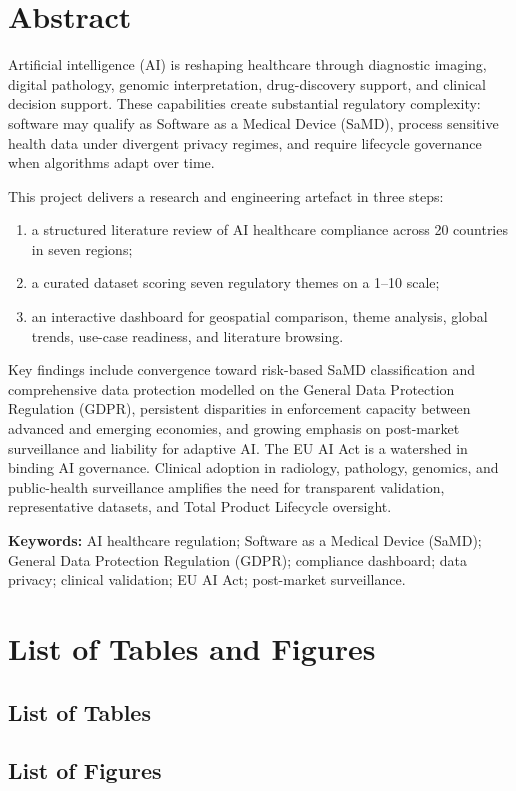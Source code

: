\documentclass[12pt,a4paper]{report}
\begin{document}
\chapter*{Abstract}

Artificial intelligence (AI) is reshaping healthcare through diagnostic imaging, digital pathology, genomic interpretation, drug-discovery support, and clinical decision support. These capabilities create substantial regulatory complexity: software may qualify as Software as a Medical Device (SaMD), process sensitive health data under divergent privacy regimes, and require lifecycle governance when algorithms adapt over time.

This project delivers a research and engineering artefact in three steps:
\begin{enumerate}[label=(\roman*), leftmargin=*, itemsep=2pt, topsep=4pt]
  \item a structured literature review of AI healthcare compliance across 20 countries in seven regions;
  \item a curated dataset scoring seven regulatory themes on a 1--10 scale;
  \item an interactive dashboard for geospatial comparison, theme analysis, global trends, use-case readiness, and literature browsing.
\end{enumerate}

Key findings include convergence toward risk-based SaMD classification and comprehensive data protection modelled on the General Data Protection Regulation (GDPR), persistent disparities in enforcement capacity between advanced and emerging economies, and growing emphasis on post-market surveillance and liability for adaptive AI. The EU AI Act is a watershed in binding AI governance. Clinical adoption in radiology, pathology, genomics, and public-health surveillance amplifies the need for transparent validation, representative datasets, and Total Product Lifecycle oversight.

\textbf{Keywords:} AI healthcare regulation; Software as a Medical Device (SaMD); General Data Protection Regulation (GDPR); compliance dashboard; data privacy; clinical validation; EU AI Act; post-market surveillance.

\tableofcontents
\clearpage
\chapter*{List of Tables and Figures}
\vspace{-0.4em}
{\small
\section*{List of Tables}
\makeatletter
{}
\makeatother
\vspace{0.6em}
\section*{List of Figures}
\makeatletter
{}
\makeatother
}
\clearpage
{}
\end{document}
